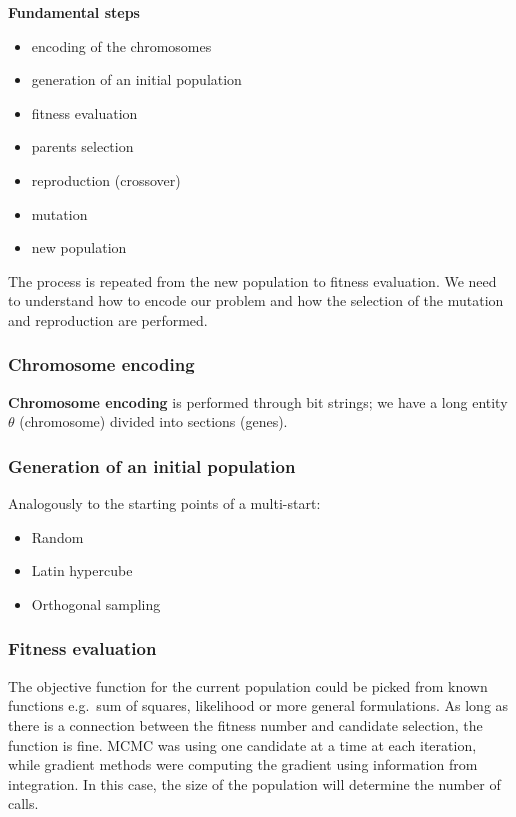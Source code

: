 \textbf{Fundamental steps}

\begin{itemize}
\tightlist
\item
  encoding of the chromosomes
\item
  generation of an initial population
\item
  fitness evaluation
\item
  parents selection
\item
  reproduction (crossover)
\item
  mutation
\item
  new population
\end{itemize}
\noindent
The process is repeated from the new population to fitness evaluation.
We need to understand how to encode our problem and how the selection of
the mutation and reproduction are performed.


\subsubsection{Chromosome encoding}

\textbf{Chromosome encoding} is performed through bit strings; we have a
long entity \(\theta\) (chromosome) divided into sections (genes).


\subsubsection{Generation of an initial population}

Analogously to the starting points of a multi-start:

\begin{itemize}
\tightlist
\item
  Random
\item
  Latin hypercube
\item
  Orthogonal sampling
\end{itemize}

\subsubsection{Fitness evaluation}

The objective function for the current population could be picked from
known functions e.g.~sum of squares, likelihood or more general
formulations. As long as there is a connection between the fitness
number and candidate selection, the function is fine. MCMC was using one
candidate at a time at each iteration, while gradient methods were
computing the gradient using information from integration. In this case,
the size of the population will determine the number of calls.

